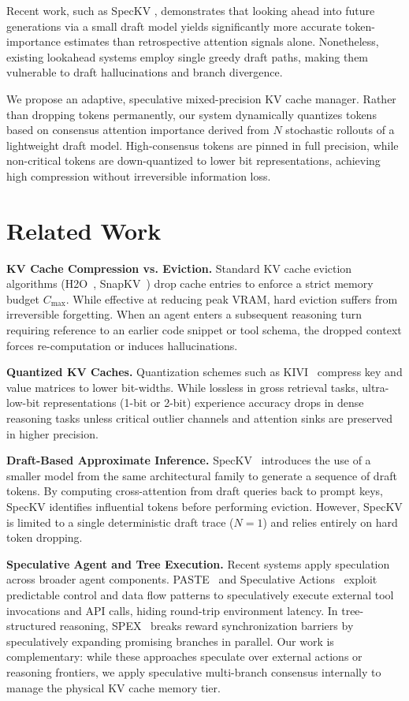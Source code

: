 \documentclass[10pt,twocolumn,letterpaper]{article}
\begin{document}
Recent work, such as SpecKV \cite{speckv26}, demonstrates that looking ahead into future generations via a small draft model yields significantly more accurate token-importance estimates than retrospective attention signals alone. Nonetheless, existing lookahead systems employ single greedy draft paths, making them vulnerable to draft hallucinations and branch divergence.

We propose an adaptive, speculative mixed-precision KV cache manager. Rather than dropping tokens permanently, our system dynamically quantizes tokens based on consensus attention importance derived from $N$ stochastic rollouts of a lightweight draft model. High-consensus tokens are pinned in full precision, while non-critical tokens are down-quantized to lower bit representations, achieving high compression without irreversible information loss.

\section{Related Work}
\noindent\textbf{KV Cache Compression vs. Eviction.} Standard KV cache eviction algorithms (H2O~\cite{h2023}, SnapKV~\cite{snapkv24}) drop cache entries to enforce a strict memory budget $C_{\text{max}}$. While effective at reducing peak VRAM, hard eviction suffers from irreversible forgetting. When an agent enters a subsequent reasoning turn requiring reference to an earlier code snippet or tool schema, the dropped context forces re-computation or induces hallucinations.

\noindent\textbf{Quantized KV Caches.} Quantization schemes such as KIVI~\cite{kivi24} compress key and value matrices to lower bit-widths. While lossless in gross retrieval tasks, ultra-low-bit representations (1-bit or 2-bit) experience accuracy drops in dense reasoning tasks unless critical outlier channels and attention sinks are preserved in higher precision.

\noindent\textbf{Draft-Based Approximate Inference.} SpecKV~\cite{speckv26} introduces the use of a smaller model from the same architectural family to generate a sequence of draft tokens. By computing cross-attention from draft queries back to prompt keys, SpecKV identifies influential tokens before performing eviction. However, SpecKV is limited to a single deterministic draft trace ($N=1$) and relies entirely on hard token dropping.

\noindent\textbf{Speculative Agent and Tree Execution.} Recent systems apply speculation across broader agent components. PASTE~\cite{sui2026parallelizingtoolexecutionllm} and Speculative Actions~\cite{specaction26} exploit predictable control and data flow patterns to speculatively execute external tool invocations and API calls, hiding round-trip environment latency. In tree-structured reasoning, SPEX~\cite{tot2026} breaks reward synchronization barriers by speculatively expanding promising branches in parallel. Our work is complementary: while these approaches speculate over external actions or reasoning frontiers, we apply speculative multi-branch consensus internally to manage the physical KV cache memory tier.
\end{document}
